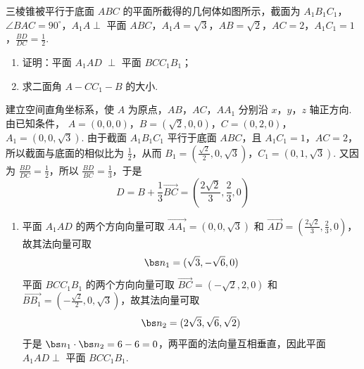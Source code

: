 \begin{problem}
三棱锥被平行于底面 \(ABC\) 的平面所截得的几何体如图所示，截面为 \(A_{1}B_{1}C_{1}\)，\(\angle BAC = 90^{\circ}\)，\(A_{1}A \perp\) 平面 \(ABC\)，\(A_{1}A = \sqrt{3}\)，\(AB = \sqrt{2}\)，\(AC = 2\)，\(A_{1}C_{1} = 1\)，\(\frac{BD}{DC} = \frac{1}{2}\).

\begin{enumerate}
\item 证明：平面 \(A_{1}AD\) \(\perp\) 平面 \(BCC_{1}B_{1}\)；
\item 求二面角 \(A-CC_{1}-B\) 的大小.
\end{enumerate}

\end{problem}

\begin{solution}
建立空间直角坐标系，使 \(A\) 为原点，\(AB\)，\(AC\)，\(AA_{1}\) 分别沿 \(x\)，\(y\)，\(z\) 轴正方向. 由已知条件，
\(A=(0,0,0)\)，\(B=(\sqrt{2},0,0)\)，\(C=(0,2,0)\)，\(A_{1}=(0,0,\sqrt{3})\).
由于截面 \(A_{1}B_{1}C_{1}\) 平行于底面 \(ABC\)，且 \(A_{1}C_{1}=1\)，\(AC=2\)，所以截面与底面的相似比为 \(\frac{1}{2}\)，从而
\(B_{1}=\left(\frac{\sqrt{2}}{2},0,\sqrt{3}\right)\)，\(C_{1}=(0,1,\sqrt{3})\).
又因为 \(\frac{BD}{DC}=\frac{1}{2}\)，所以 \(\frac{BD}{BC}=\frac{1}{3}\)，于是
\[
D=B+\frac{1}{3}\overrightarrow{BC}=\left(\frac{2\sqrt{2}}{3},\frac{2}{3},0\right)
\]

\begin{enumerate}
\item 平面 \(A_{1}AD\) 的两个方向向量可取 \(\overrightarrow{AA_{1}}=(0,0,\sqrt{3})\) 和 \(\overrightarrow{AD}=\left(\frac{2\sqrt{2}}{3},\frac{2}{3},0\right)\)，故其法向量可取
\[
\bs n_{1}=(\sqrt{3},-\sqrt{6},0)
\]
平面 \(BCC_{1}B_{1}\) 的两个方向向量可取 \(\overrightarrow{BC}=(-\sqrt{2},2,0)\) 和 \(\overrightarrow{BB_{1}}=\left(-\frac{\sqrt{2}}{2},0,\sqrt{3}\right)\)，故其法向量可取
\[
\bs n_{2}=(2\sqrt{3},\sqrt{6},\sqrt{2})
\]
于是 \(\bs n_{1}\cdot\bs n_{2}=6-6=0\)，两平面的法向量互相垂直，因此平面 \(A_{1}AD\perp\) 平面 \(BCC_{1}B_{1}\).


\end{enumerate}
\end{solution}
